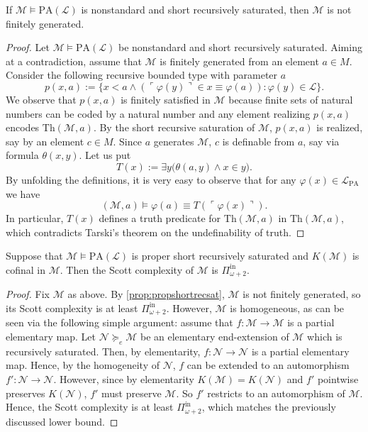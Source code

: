 \documentclass[11pt]{amsart}
\newcommand{\mc}[1]{\mathcal{#1}}
\newcommand{\Pinf}[1]{\Pi^{\mathrm{in}}_{#1}}
\newcommand{\PA}{\mathrm{PA}}
\newcommand{\Th}{\mathrm{Th}}
\renewcommand{\phi}{\varphi}
\theoremstyle{remark}
\begin{document}
\begin{proposition}\label{prop:propshortrecsat}
    If $\mc{M}\models\PA(\mathcal{L})$ is nonstandard and short recursively saturated, then $\mc{M}$ is not finitely generated.
\end{proposition}
\begin{proof}
    Let $\mc{M}\models \PA(\mathcal{L})$ be nonstandard and short recursively saturated. Aiming at a contradiction, assume that $\mc{M}$ is finitely generated from an element $a\in M$. Consider the following recursive bounded type with parameter $a$
    \[p(x,a):= \{x<a \wedge (\ulcorner\phi(y)\urcorner\in x \equiv\phi(a)) : \phi(y)\in \mc{L}\}.\]
    We observe that $p(x,a)$ is finitely satisfied in $\mc{M}$ because finite sets of natural numbers can be coded by a natural number and any element realizing $p(x,a)$ encodes $\Th(\mc{M}, a)$. By the short recursive saturation of $\mc{M}$, $p(x,a)$ is realized, say by an element $c\in M$. Since $a$ generates $\mc{M}$, $c$ is definable from $a$, say via formula $\theta(x,y)$. Let us put
    \[T(x):= \exists y\bigl(\theta(a,y)\wedge x\in y\bigr).\]
    By unfolding the definitions, it is very easy to observe that for any $\phi(x)\in\mc{L}_{\PA}$ we have
    \[(\mc{M},a)\models \phi(a) \equiv T(\ulcorner{\phi(x)\urcorner}). \]
    In particular, $T(x)$ defines a truth predicate for $\Th(\mc{M},a)$ in $\Th(\mc{M},a)$, which contradicts Tarski's theorem on the undefinability of truth.
\end{proof}

\begin{proposition}
    Suppose that $\mc{M}\models\PA(\mathcal{L})$ is proper short recursively saturated and $K({\mc{M}})$ is cofinal in $\mc{M}$. Then the Scott complexity of $\mc{M}$ is $\Pinf{\omega+2}$.
\end{proposition}
\begin{proof}
    Fix $\mc{M}$ as above. By \cref{prop:propshortrecsat}, $\mc{M}$ is not finitely generated, so its Scott complexity is at least $\Pinf{\omega+2}$. However, $\mc{M}$ is homogeneous, as can be seen via the following simple argument: assume that $f:\mc{M}\rightarrow\mc{M}$ is a partial elementary map. Let $\mc{N}\succeq_e\mc{M}$ be an elementary end-extension of $\mc{M}$ which is recursively saturated. Then, by elementarity, $f:\mc{N}\rightarrow \mc{N}$ is a partial elementary map. Hence, by the homogeneity of $\mc{N}$, $f$ can be extended to an automorphism $f':\mc{N}\rightarrow\mc{N}$. However, since by elementarity $K({\mc{M}}) = K({\mc{N}})$ and $f'$ pointwise preserves $K({\mc{N}})$, $f'$ must preserve $\mc{M}$. So $f'$ restricts to an automorphism of $\mc{M}$.  Hence, the Scott complexity is at least $\Pinf{\omega+2}$, which matches the previously discussed lower bound.
    
\end{proof}
\end{document}
